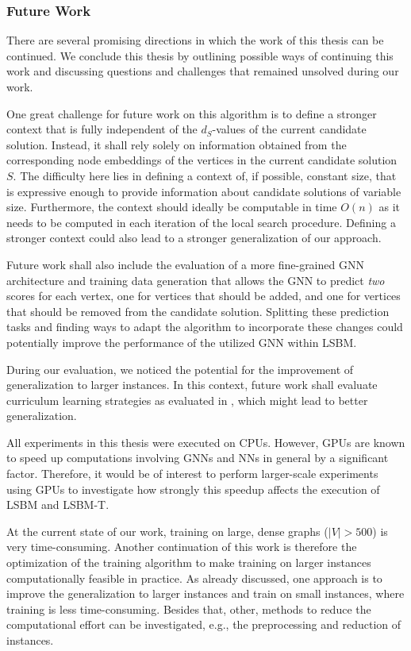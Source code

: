 \documentclass[draft,final]{vutinfth} %
\begin{document}
\subsubsection{Future Work}

There are several promising directions in which the work of this thesis can be continued. We conclude this thesis by outlining possible ways of continuing this work and discussing questions and challenges that remained unsolved during our work. 

One great challenge for future work on this algorithm is to define a stronger context that is fully independent of the $d_S$-values of the current candidate solution. Instead, it shall rely solely on information obtained from the corresponding node embeddings of the vertices in the current candidate solution $S$. The difficulty here lies in defining a context of, if possible, constant size, that is expressive enough to provide information about candidate solutions of variable size. Furthermore, the context should ideally be computable in time $O(n)$ as it needs to be computed in each iteration of the local search procedure. 
Defining a stronger context could also lead to a stronger generalization of our approach. 

Future work shall also include the evaluation of a more fine-grained GNN architecture and training data generation that allows the GNN to predict \emph{two} scores for each vertex, one for vertices that should be added, and one for vertices that should be removed from the candidate solution. 
Splitting these prediction tasks and finding ways to adapt the algorithm to incorporate these changes could potentially improve the performance of the utilized GNN within LSBM. 

During our evaluation, we noticed the potential for the improvement of generalization to larger instances. In this context, future work shall evaluate curriculum learning strategies as evaluated in \cite{Lisicki2020}, which might lead to better generalization. 

All experiments in this thesis were executed on CPUs. However, GPUs are known to speed up computations involving GNNs and NNs in general by a significant factor. Therefore, it would be of interest to perform larger-scale experiments using GPUs to investigate how strongly this speedup affects the execution of LSBM and LSBM-T. 

At the current state of our work, training on large, dense graphs ($|V| > 500$) is very time-consuming. 
Another continuation of this work is therefore the optimization of the training algorithm to make training on larger instances computationally feasible in practice. 
As already discussed, one approach is to improve the generalization to larger instances and train on small instances, where training is less time-consuming. 
Besides that, other, methods to reduce the computational effort can be investigated, e.g., the preprocessing and reduction of instances. 
\end{document}

